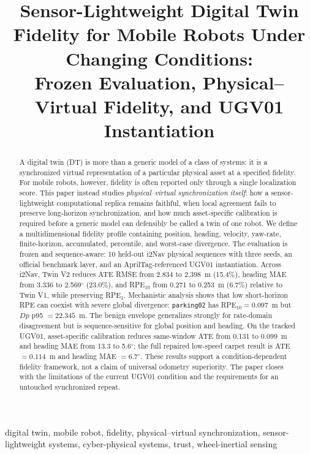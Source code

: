 \documentclass[conference]{IEEEtran}
\title{Sensor-Lightweight Digital Twin Fidelity for Mobile Robots Under Changing Conditions:\\
Frozen Evaluation, Physical--Virtual Fidelity, and UGV01 Instantiation}
\author{\IEEEauthorblockN{Shreyas Udaya}
\IEEEauthorblockA{Bradley Department of Electrical and Computer Engineering\\
Virginia Tech\\
Blacksburg, VA, USA\\
\textit{Research status draft --- August 2026}}}
\begin{document}
\maketitle

\begin{abstract}
A digital twin (DT) is more than a generic model of a class of systems: it is a synchronized virtual representation of a particular physical asset at a specified fidelity. For mobile robots, however, fidelity is often reported only through a single localization score. This paper instead studies \emph{physical--virtual synchronization itself}: how a sensor-lightweight computational replica remains faithful, when local agreement fails to preserve long-horizon synchronization, and how much asset-specific calibration is required before a generic model can defensibly be called a twin of one robot. We define a multidimensional fidelity profile containing position, heading, velocity, yaw-rate, finite-horizon, accumulated, percentile, and worst-case divergence. The evaluation is frozen and sequence-aware: 10 held-out i2Nav physical sequences with three seeds, an official benchmark layer, and an AprilTag-referenced UGV01 instantiation. Across i2Nav, Twin V2 reduces ATE RMSE from 2.834 to 2.398~m (15.4\%), heading MAE from 3.336 to 2.569$^{\circ}$ (23.0\%), and RPE$_{10}$ from 0.271 to 0.253~m (6.7\%) relative to Twin V1, while preserving RPE$_1$. Mechanistic analysis shows that low short-horizon RPE can coexist with severe global divergence: \texttt{parking02} has RPE$_{10}=0.097$~m but $Dp$ p95 $=22.345$~m. The benign envelope generalizes strongly for rate-domain disagreement but is sequence-sensitive for global position and heading. On the tracked UGV01, asset-specific calibration reduces same-window ATE from 0.131 to 0.099~m and heading MAE from 13.3 to 5.6$^{\circ}$; the full repaired low-speed carpet result is ATE $=0.114$~m and heading MAE $=6.7^{\circ}$. These results support a condition-dependent fidelity framework, not a claim of universal odometry superiority. The paper closes with the limitations of the current UGV01 condition and the requirements for an untouched synchronized repeat.
\end{abstract}

\begin{IEEEkeywords}
digital twin, mobile robot, fidelity, physical--virtual synchronization, sensor-lightweight systems, cyber-physical systems, trust, wheel-inertial sensing
\end{IEEEkeywords}
\end{document}
